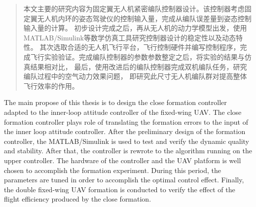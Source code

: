 
\begin{abstract}

本文主要的研究内容为固定翼无人机紧密编队控制器设计。该控制器考虑固定翼无人机内环的姿态驾驶仪的控制输入量，完成从编队误差量到姿态控制输入量的计算。
初步设计完成之后，再从无人机的动力学模型出发，使用MATLAB/Simulink等数学仿真工具研究控制器设计的稳定性以及动态特性。
其次选取合适的无人机飞行平台，飞行控制硬件并编写控制程序，完成飞行实验验证。完成编队控制器的参数参数整定之后，将实验的结果与仿真结果相对比，
最后，使用改进后的编队控制器完成双机编队任务，研究编队过程中的空气动力效果问题，
即研究此尺寸无人机编队群对提高整体飞行效率的作用。

\end{abstract}

\begin{englishabstract}

The main propose of this thesis is to design the close formation controller adapted to the inner-loop attitude controller of
the fixed-wing UAV. The close formation controller plays role of translating the formation errors to the input of the inner loop
attitude controller. After the preliminary design of the formation controller, the MATLAB/Simulink is used to test and verify the 
dynamic quality and stability. After that, the controller is rewrote to the algorithm running on the upper controller. The hardware
of the controller and the UAV platform is well chosen to accomplish the formation experiment. During this period, the parameters are 
tuned in order to accomplish the optimal control effect.
Finally, the double fixed-wing UAV formation is conducted to verify the effect of the flight efficiency produced by the close formation.
   

\end{englishabstract}
